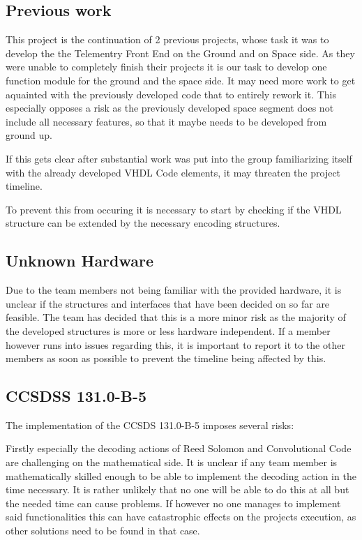 \subsection{Previous work}
This project is the continuation of 2 previous projects, whose task it was to develop the the Telementry Front End on the Ground and on Space side. As they were unable to completely finish their projects it is our task to develop one function module for the ground and the space side. It may need more work to get aquainted with the previously developed code that to entirely rework it. This especially opposes a risk as the previously developed space segment does not include all necessary features, so that it maybe needs to be developed from ground up.

If this gets clear after substantial work was put into the group familiarizing itself with the already developed VHDL Code elements, it may threaten the project timeline.

To prevent this from occuring it is necessary to start by checking if the VHDL structure can be extended by the necessary encoding structures.

\subsection{Unknown Hardware}
Due to the team members not being  familiar with the provided hardware, it is unclear if the structures and interfaces that have been decided on so far are feasible. The team has decided that this is a more minor risk as the majority of the developed structures is more or less hardware independent. If a member however runs into issues regarding this, it is important to report it to the other members as soon as possible to prevent the timeline being affected by this.

\subsection{CCSDSS 131.0-B-5}
The implementation of the CCSDS 131.0-B-5 imposes several risks:

Firstly especially the decoding actions of Reed Solomon and Convolutional Code are challenging on the mathematical side. It is unclear if any team member is mathematically skilled enough to be able to implement the decoding action in the time necessary. It is rather unlikely that no one will be able to do this at all but the needed time can cause problems. If however no one manages to implement said functionalities this can have catastrophic effects on the projects execution, as other solutions need to be found in that case.

